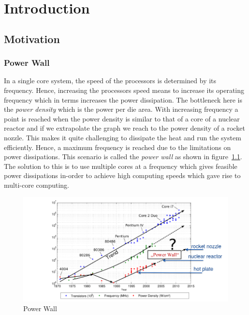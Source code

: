 \documentclass{listhesis}
\begin{document}
\chapter{Introduction}
\section{Motivation}
\subsection{Power Wall}
In a single core system, the speed of the processors is determined by its frequency. Hence, increasing the processors speed means to increase its operating frequency which in terms increases the power dissipation. The bottleneck here is the \textit{power density} which is the power per die area. With increasing frequency a point is reached when the power density is similar to that of a core of a nuclear reactor and if we extrapolate the graph we reach to the power density of a rocket nozzle. This makes it quite challenging to dissipate the heat and run the system efficiently. Hence, a maximum frequency is reached due to the limitations on power dissipations. This scenario is called the \textit{power wall} as shown in figure~\ref{fig:powerwall}. The solution to this is to use multiple cores at a frequency which gives feasible power dissipations in-order to achieve high computing speeds which gave rise to multi-core computing.\\
\begin{figure}[h!]
  \includegraphics[width=\linewidth]{powerwall.png}
  \centering
  \caption{Power Wall~\cite{chipmulticore}}
  \label{fig:powerwall}
\end{figure}
\end{document}

